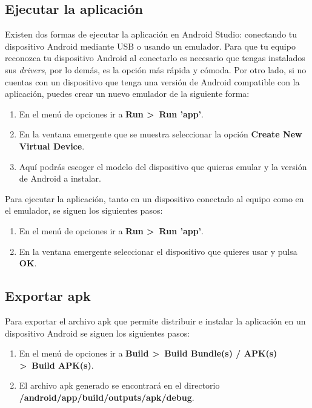 \subsection{Ejecutar la aplicación}

Existen dos formas de ejecutar la aplicación en Android Studio: conectando tu dispositivo Android mediante USB o usando un emulador. Para que tu equipo reconozca tu dispositivo Android al conectarlo es necesario que tengas instalados sus \textit{drivers}, por lo demás, es la opción más rápida y cómoda. Por otro lado, si no cuentas con un dispositivo que tenga una versión de Android compatible con la aplicación, puedes crear un nuevo emulador de la siguiente forma: 

\begin{enumerate}
	\item En el menú de opciones ir a \textbf{Run >~Run 'app'}. 
	\item En la ventana emergente que se muestra seleccionar la opción \textbf{Create New Virtual Device}. 
	\item Aquí podrás escoger el modelo del dispositivo que quieras emular y la versión de Android a instalar. 
\end{enumerate}

Para ejecutar la aplicación, tanto en un dispositivo conectado al equipo como en el emulador, se siguen los siguientes pasos: 

\begin{enumerate}
	\item En el menú de opciones ir a \textbf{Run >~Run 'app'}.
	\item En la ventana emergente seleccionar el dispositivo que quieres usar y pulsa \textbf{OK}. 
\end{enumerate}

\subsection{Exportar apk}

Para exportar el archivo apk que permite distribuir e instalar la aplicación en un dispositivo Android se siguen los siguientes pasos: 

\begin{enumerate}
	\item En el menú de opciones ir a \textbf{Build >~Build Bundle(s) / APK(s) >~Build APK(s)}. 
	\item El archivo apk generado se encontrará en el directorio \\ \textbf{/android/app/build/outputs/apk/debug}.
\end{enumerate}

